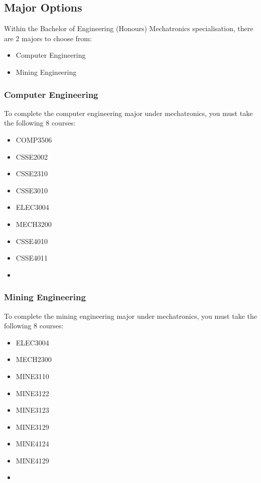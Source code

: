 \documentclass[a4paper,12pt]{report}
\begin{document}
\newpage

\subsection{Major Options}
Within the Bachelor of Engineering (Honours) Mechatronics specialisation, there are 2 majors to choose from:
\begin{itemize}
    \item Computer Engineering
    \item Mining Engineering
\end{itemize}

\subsubsection{Computer Engineering}
To complete the computer engineering major under mechatronics, you must take the following 8 courses:
\begin{multicols}{3}
    \begin{itemize}
        \item COMP3506
        \item CSSE2002
        \item CSSE2310
        \item CSSE3010
        \item ELEC3004
        \item MECH3200
        \item CSSE4010
        \item CSSE4011
        \item[]
    \end{itemize}
\end{multicols}

\subsubsection{Mining Engineering}
To complete the mining engineering major under mechatronics, you must take the following 8 courses:
\begin{multicols}{3}
    \begin{itemize}
        \item ELEC3004
        \item MECH2300
        \item MINE3110
        \item MINE3122
        \item MINE3123
        \item MINE3129
        \item MINE4124
        \item MINE4129
        \item[]
    \end{itemize}
\end{multicols}
\end{document}
